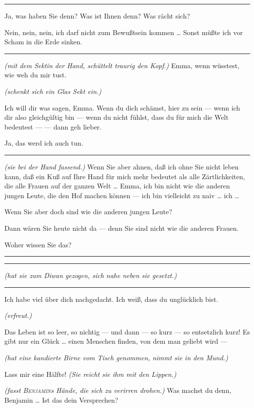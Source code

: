 \documentclass[
	final,
	a4paper,
	ngerman,
	mpinclude = true, %
	twoside = true,
	open = right,
	cleardoublepage = plain,
	DIV = 13,
	BCOR = 1cm,
	titlepage = firstiscover,
	]{scrbook}
\newcommand{\direction}[1]{\textit{(#1)}}
\newenvironment{deletion}{%
		\vspace{0.25\baselineskip}
		\hrule
		\vspace{0.25\baselineskip}
		\color{darkgray}
	}{
		\color{black}
		\vspace{0.25\baselineskip}
		\hrule 
		\vspace{0.25\baselineskip}
	}
\newcommand{\thecharacter}[1]{\textup{\textsc{#1}}\xspace}
\newcommand{\theherr}{\thecharacter{Benjamin}}
\newcommand{\thefrau}{\thecharacter{Emma}}
\newcommand{\character}[1]{\item[#1:]}
\newcommand{\herr}{\character{\theherr}}
\newcommand{\frau}{\character{\thefrau}}
\begin{document}
\begin{play}
\begin{deletion}
	\herr
	Ja, was haben Sie denn? Was ist Ihnen denn? Was rächt sich?

	\frau
	Nein, nein, nein, ich darf nicht zum Bewußtsein kommen \ldots{} Sonst müßte ich vor Scham in die Erde sinken.
	\end{deletion}

	\herr
	\direction{mit dem Sektin der Hand, schüttelt traurig den Kopf.} Emma, wenn wüsstest, wie weh du mir tust.

	\frau
	\direction{schenkt sich ein Glas Sekt ein.}

	\herr
	Ich will dir was sagen, Emma. Wenn du dich schämst, hier zu sein --- wenn ich dir also gleichgültig bin --- wenn du nicht fühlst, dass du für mich die Welt bedeutest --- --- dann geh lieber.

	\frau
	Ja, das werd ich auch tun.

	\begin{deletion}
	\herr
	\direction{sie bei der Hand fassend.} Wenn Sie aber ahnen, daß ich ohne Sie nicht leben kann, daß ein Kuß auf Ihre Hand für mich mehr bedeutet als alle Zärtlichkeiten, die alle Frauen auf der ganzen Welt \ldots{} Emma, ich bin nicht wie die anderen jungen Leute, die den Hof machen können --- ich bin vielleicht zu naiv \ldots{} ich \ldots{}

	\frau
	Wenn Sie aber doch sind wie die anderen jungen Leute?

	\herr
	Dann wären Sie heute nicht da --- denn Sie sind nicht wie die anderen Frauen.

	\frau
	Woher wissen Sie das?
	\end{deletion}

	\herr
	\begin{deletion}
		\direction{hat sie zum Diwan gezogen, sich nahe neben sie gesetzt.}
	\end{deletion}
	Ich habe viel über dich nachgedacht. Ich weiß, dass du unglücklich bist.

	\frau
	\direction{erfreut.}

	\herr
	Das Leben ist so leer, so nichtig --- und dann --- so kurz --- so entsetzlich kurz! Es gibt nur ein Glück \ldots{} einen Menschen finden, von dem man geliebt wird ---

	\frau
	\direction{hat eine kandierte Birne vom Tisch genommen, nimmt sie in den Mund.}

	\herr
	Lass mir eine Hälfte! \direction{Sie reicht sie ihm mit den Lippen.}

	\frau
	\direction{fasst \theherr{}s Hände, die sich zu verirren drohen.} Was machst du denn, Benjamin \ldots{} Ist das dein Versprechen?


\end{play}
\end{document}
